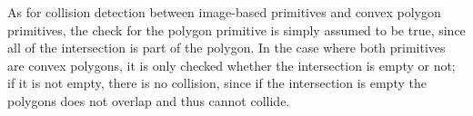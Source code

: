 As for collision detection between image-based primitives and convex polygon
primitives, the check for the polygon primitive is simply assumed to be true,
since all of the intersection is part of the polygon.
In the case where both primitives are convex polygons, it is only checked
whether the intersection is empty or not; if it is not empty, there is no collision,
since if the intersection is empty the polygons does not overlap and thus cannot
collide.

